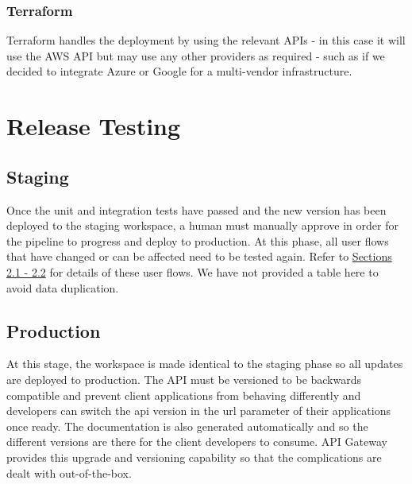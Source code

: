 \documentclass[10pt]{article}
\begin{document}
\subsubsection{Terraform}
Terraform handles the deployment by using the relevant APIs - in this case it will use the AWS API but may use any other providers as required - such as if we decided to integrate Azure or Google for a multi-vendor infrastructure.


\section{Release Testing}
\subsection{Staging}
Once the unit and integration tests have passed and the new version has been deployed to the staging workspace, a human must manually approve in order for the pipeline to progress and deploy to production. At this phase, all user flows that have changed or can be affected need to be tested again. Refer to \hyperref[flow-steps]{Sections 2.1 - 2.2} for details of these user flows. We have not provided a table here to avoid data duplication.
\subsection{Production}
At this stage, the workspace is made identical to the staging phase so all updates are deployed to production. The API must be versioned to be backwards compatible and prevent client applications from behaving differently and developers can switch the api version in the url parameter of their applications once ready. The documentation is also generated automatically and so the different versions are there for the client developers to consume. API Gateway provides this upgrade and versioning capability so that the complications are dealt with out-of-the-box.

\newpage
\printbibliography
\end{document}
